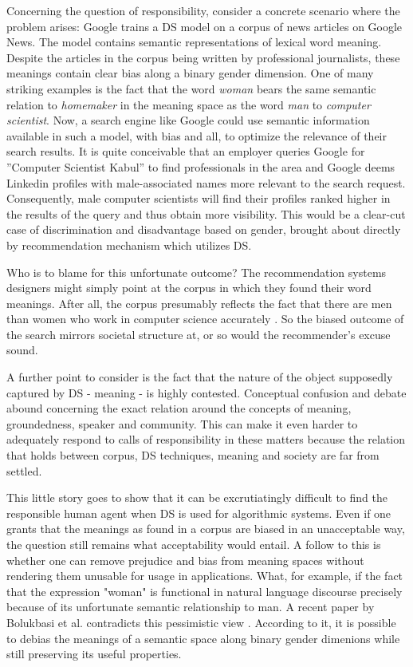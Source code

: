 \documentclass{article}
\begin{document}
Concerning the question of responsibility, consider a concrete scenario where the problem arises: Google trains a DS model on a corpus of news articles on Google News. The model contains semantic representations of lexical word meaning. Despite the articles in the corpus being written by professional journalists, these meanings contain clear bias along a binary gender dimension. One of many striking examples is the fact that the word \emph{woman} bears the same semantic relation to \emph{homemaker} in the meaning space as the word \emph{man} to \emph{computer scientist}. Now, a search engine like Google could use semantic information available in such a model, with bias and all, to optimize the relevance of their search results. It is quite conceivable that an employer queries Google for ''Computer Scientist Kabul'' to find professionals in the area and Google deems Linkedin profiles with male-associated names more relevant to the search request. Consequently, male computer scientists will find their profiles ranked higher in the results of the query and thus obtain more visibility. This would be a clear-cut case of discrimination and disadvantage based on gender, brought about directly by recommendation mechanism which utilizes DS.

Who is to blame for this unfortunate outcome? The recommendation systems designers might simply point at the corpus in which they found their word meanings. After all, the corpus presumably reflects the fact that there are men than women who work in computer science accurately \cite{womenincs}. So the biased outcome of the search mirrors societal structure at, or so would the recommender's excuse sound. 

A further point to consider is the fact that the nature of the object supposedly captured by DS - meaning - is highly contested. Conceptual confusion and debate abound concerning the exact relation around the concepts of meaning, groundedness, speaker and community. This can make it even harder to adequately respond to calls of responsibility in these matters because the relation that holds between corpus, DS techniques, meaning and society are far from settled. 

This little story goes to show that it can be excrutiatingly difficult to find the responsible human agent when DS is used for algorithmic systems. Even if one grants that the meanings as found in a corpus are biased in an unacceptable way, the question still remains what acceptability would entail. A follow to this is whether one can remove prejudice and bias from meaning spaces without rendering them unusable for usage in applications. What, for example, if the fact that the expression "woman" is functional in natural language discourse precisely because of its unfortunate semantic relationship to man. A recent paper by Bolukbasi et al. contradicts this pessimistic view \cite{bolukbasi2016man}. According to it, it is possible to debias the meanings of a semantic space along binary gender dimenions while still preserving its useful properties.
\end{document}
